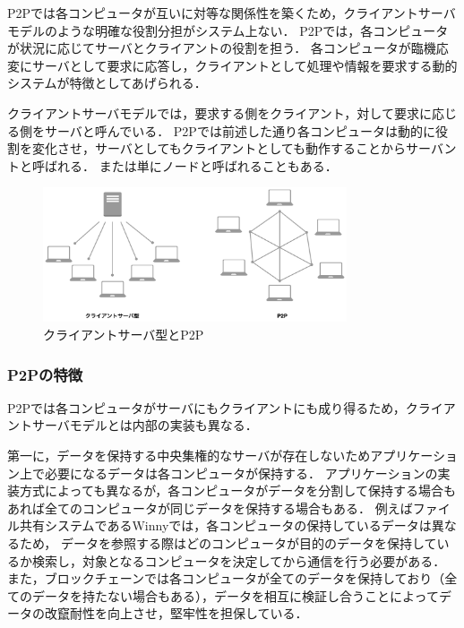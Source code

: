 P2Pでは各コンピュータが互いに対等な関係性を築くため，クライアントサーバモデルのような明確な役割分担がシステム上ない．
P2Pでは，各コンピュータが状況に応じてサーバとクライアントの役割を担う．
各コンピュータが臨機応変にサーバとして要求に応答し，クライアントとして処理や情報を要求する動的システムが特徴としてあげられる．

クライアントサーバモデルでは，要求する側をクライアント，対して要求に応じる側をサーバと呼んでいる．
P2Pでは前述した通り各コンピュータは動的に役割を変化させ，サーバとしてもクライアントとしても動作することからサーバントと呼ばれる．
または単にノードと呼ばれることもある．

\begin{figure}[htbp]
  \begin{center}
    \includegraphics[width=0.8\textwidth]{./figures/client-server-and-p2p.png}
    \caption{クライアントサーバ型とP2P}
  \end{center}
\end{figure}

\subsubsection{P2Pの特徴}

P2Pでは各コンピュータがサーバにもクライアントにも成り得るため，クライアントサーバモデルとは内部の実装も異なる．

第一に，データを保持する中央集権的なサーバが存在しないためアプリケーション上で必要になるデータは各コンピュータが保持する．
アプリケーションの実装方式によっても異なるが，各コンピュータがデータを分割して保持する場合もあれば全てのコンピュータが同じデータを保持する場合もある．
例えばファイル共有システムであるWinnyでは，各コンピュータの保持しているデータは異なるため，
データを参照する際はどのコンピュータが目的のデータを保持しているか検索し，対象となるコンピュータを決定してから通信を行う必要がある．
また，ブロックチェーンでは各コンピュータが全てのデータを保持しており（全てのデータを持たない場合もある），データを相互に検証し合うことによってデータの改竄耐性を向上させ，堅牢性を担保している．

